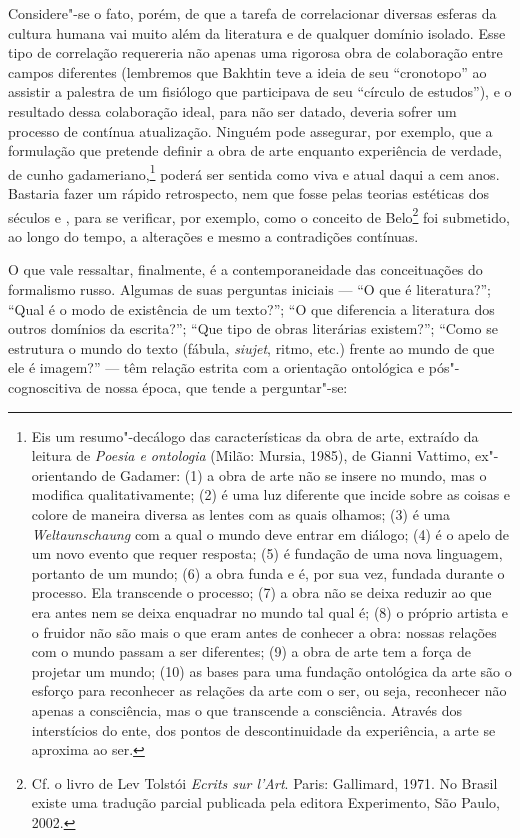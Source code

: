 Considere"-se o fato, porém, de que a tarefa de correlacionar diversas
esferas da cultura humana vai muito além da literatura e de qualquer
domínio isolado. Esse tipo de correlação requereria não apenas uma
rigorosa obra de colaboração entre campos diferentes (lembremos que Bakhtin teve a ideia de seu ``cronotopo'' ao
assistir a palestra de um fisiólogo que participava de seu ``círculo de
estudos''), e o resultado dessa colaboração ideal, para não ser
datado, deveria sofrer um processo de contínua atualização. Ninguém pode
assegurar, por exemplo, que a formulação que pretende definir a obra de
arte enquanto experiência de verdade, de cunho
gadameriano,\footnote{Eis 
um resumo"-decálogo das características da obra de arte, extraído da 
leitura de \emph{Poesia e ontologia} (Milão: Mursia, 1985), de Gianni 
Vattimo, ex"-orientando de Gadamer: (1) a obra de arte não se insere 
no mundo, mas o modifica qualitativamente; (2) é uma luz diferente
 que incide sobre as coisas e colore de maneira diversa as lentes com 
as quais olhamos; (3) é uma \emph{Weltaunschaung} com a qual o mundo
 deve entrar em diálogo; (4) é o apelo de um novo evento que requer 
resposta; (5) é fundação de uma nova linguagem, portanto de um mundo; 
(6) a obra funda e é, por sua vez, fundada durante o processo. Ela
 transcende o processo; (7) a obra não se deixa reduzir ao que era 
antes nem se deixa enquadrar no mundo tal qual é;
(8) o próprio artista e o fruidor não são mais o que eram antes
 de conhecer a obra: nossas relações com o mundo passam a ser 
diferentes; (9) a obra de arte tem a força de projetar um mundo; (10)
 as bases para uma fundação ontológica da arte são o esforço para
 reconhecer as relações da arte com o ser, ou seja, reconhecer não 
apenas a consciência, mas o que transcende a consciência. Através dos 
interstícios do ente, dos pontos de descontinuidade da experiência, a 
arte se aproxima ao ser.} poderá ser sentida como viva e atual daqui 
a cem anos. Bastaria fazer um rápido retrospecto, nem que fosse pelas
 teorias estéticas dos séculos  e , para se 
verificar, por exemplo, como o conceito de Belo\footnote{Cf. o 
livro de Lev Tolstói \emph{Ecrits sur l'Art}. Paris: Gallimard, 1971.
 No Brasil existe uma tradução parcial publicada pela editora 
Experimento, São Paulo, 2002.} foi submetido, ao longo do tempo, a 
alterações e mesmo a contradições contínuas.

O que vale ressaltar, finalmente, é a contemporaneidade das
conceituações do formalismo russo. Algumas de suas perguntas iniciais
--- ``O que é literatura?''; ``Qual é o modo de existência de um texto?'';
``O que diferencia a literatura dos outros domínios da escrita?''; ``Que
tipo de obras literárias existem?''; ``Como se estrutura o mundo do
texto (fábula, \emph{siujet}, ritmo, etc.) frente ao mundo de que ele é
imagem?'' --- têm relação estrita com a orientação ontológica e
pós"-cognoscitiva de nossa época, que tende a perguntar"-se:

